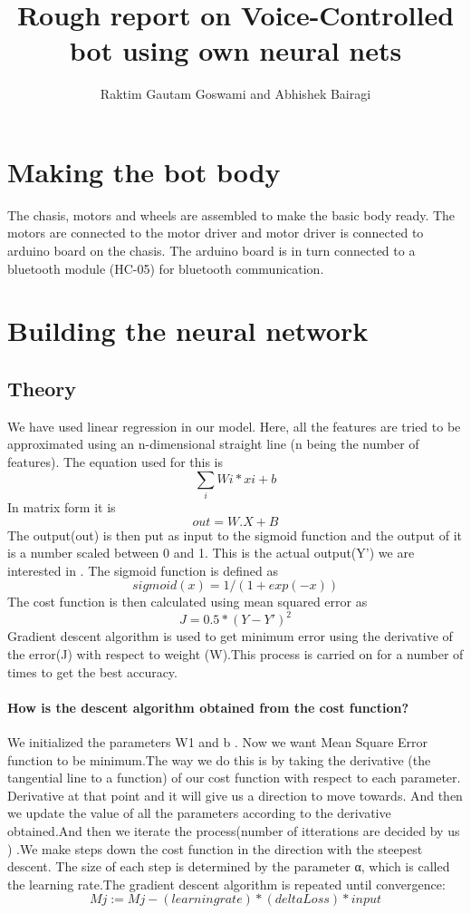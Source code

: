 \documentclass[a4paper,12pt]{article}
\begin{document}
\title{\textbf{Rough report on Voice-Controlled bot using own neural nets}}
\author{Raktim Gautam Goswami and Abhishek Bairagi}
\maketitle


\section{Making the bot body}
The chasis, motors and wheels are assembled to make the basic body ready. The motors are connected to the motor driver and motor driver is connected to arduino board on the chasis. The arduino board is in turn connected to a bluetooth module (HC-05) for bluetooth communication.

\section{Building the neural network}
\subsection{Theory}
We have used linear regression in our model. Here, all the features are tried to be approximated using an n-dimensional straight line (n being the number of features). The equation used for this is 
\begin{equation}
\sum_{i} Wi*xi + b
\end{equation}
In matrix form it is $$ out = W.X + B $$ The output(out) is then put as input to the sigmoid function and the output of it is a number scaled between 0 and 1. This is the actual output(Y') we are interested in .  The sigmoid function is defined as $$sigmoid(x) = 1/(1+exp(-x))$$ The cost function is then calculated using mean squared error as $$ J = 0.5*(Y - Y')^2$$ Gradient descent algorithm is used to get minimum error using the derivative of the error(J) with respect to weight (W).This process is carried on for a number of times to get the best accuracy.
\paragraph{How is the descent algorithm obtained from the cost function?\newline}
We initialized the parameters W1 and b . Now we want Mean Square Error function to be minimum.The way we do this is by taking the derivative (the tangential line to a function) of our cost function with respect to each parameter. Derivative at that point and it will give us a direction to move towards. And then we update the value of all the parameters according to the derivative obtained.And then we iterate the process(number of itterations are decided by us ) .We make steps down the cost function in the direction with the steepest descent. The size of each step is determined by the parameter α, which is called the learning rate.The gradient descent algorithm is repeated until convergence: $$Mj ​:= Mj​ - (learningrate)*(delta Loss)*input$$  %
\end{document}
